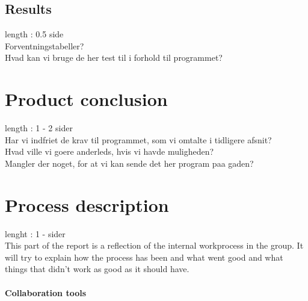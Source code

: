 \documentclass[a4paper,10pt,titlepage]{article}
\begin{document}
			
			
		\subsection{Results}
			length : 0.5 side\\
			Forventningstabeller?\\
			Hvad kan vi bruge de her test til i forhold til programmet?\\
			
	\newpage
	\section{Product conclusion}
		length : 1 - 2 sider\\
		Har vi indfriet de krav til programmet, som vi omtalte i tidligere afsnit?\\
		Hvad ville vi goere anderleds, hvis vi havde muligheden?\\
		Mangler der noget, for at vi kan sende det her program paa gaden?\\
		\newpage
		
	\section{Process description}
		lenght : 1 - sider\\
		This part of the report is a reflection of the internal workprocess in the group. It will try to explain how the process has been and what went good and what things that didn't work as good as it should have.
		\paragraph{Collaboration tools}\mbox{}\
		
\end{document}
